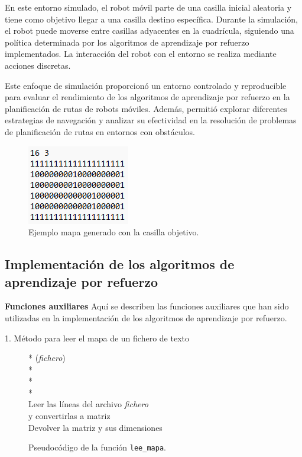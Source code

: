 \documentclass[conference,a4paper]{IEEEtran}
\begin{document}
En este entorno simulado, el robot móvil parte de una casilla inicial aleatoria y tiene como objetivo llegar a una casilla destino específica. Durante la simulación, el robot puede moverse entre casillas adyacentes en la cuadrícula, siguiendo una política determinada por los algoritmos de aprendizaje por refuerzo implementados. La interacción del robot con el entorno se realiza mediante acciones discretas.\newline

Este enfoque de simulación proporcionó un entorno controlado y reproducible para evaluar el rendimiento de los algoritmos de aprendizaje por refuerzo en la planificación de rutas de robots móviles. Además, permitió explorar diferentes estrategias de navegación y analizar su efectividad en la resolución de problemas de planificación de rutas en entornos con obstáculos.\newline

\begin{figure}[h]
  \centering
  \includegraphics{Ejemplo_mapa.png}
  \caption{Ejemplo mapa generado con la casilla objetivo.}
  \label{fig:Ejemplo_mapa}
\end{figure}

\subsection{Implementación de los algoritmos de aprendizaje por refuerzo}

\textbf{Funciones auxiliares\newline}
Aquí se describen las funciones auxiliares que han sido utilizadas en la implementación de los algoritmos de aprendizaje por refuerzo.\newline

1. Método para leer el mapa de un fichero de texto

\begin{figure}[h]
  \begin{pseudo}*
    (\textit{fichero}) \\*
     \\*
     \\*
    \\
    Leer las líneas del archivo \textit{fichero}\\
    y convertirlas a matriz\\
    Devolver la matriz y sus dimensiones
  \end{pseudo}
  \caption{Pseudocódigo de la función \texttt{lee\_mapa}.}
  \label{fig:lee_mapa}
\end{figure}
\end{document}
